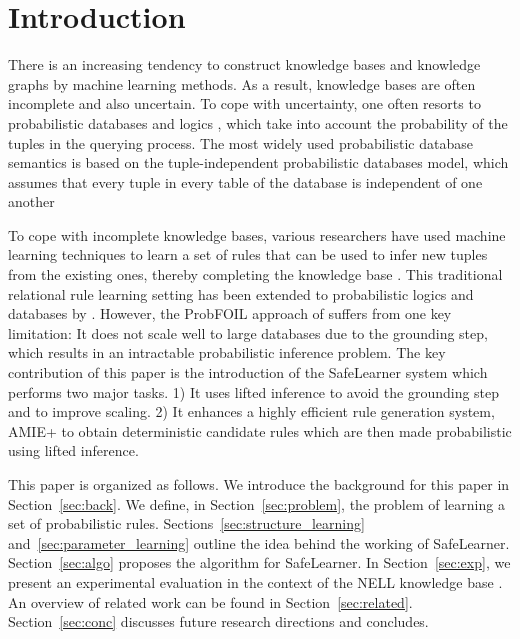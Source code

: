 \documentclass[akbc,twoside,11pt]{article}
\newcommand{\algorithmname}{SafeLearner\xspace}
\begin{document}
\section{Introduction}
\label{Introduction}
There is an increasing tendency to construct knowledge bases and knowledge graphs by machine learning methods. As a result, knowledge bases are often incomplete and also uncertain. To cope with uncertainty, one often resorts to probabilistic databases and logics \cite{DBLP:journals/ftdb/BroeckS17,2016Raedt}, which take into account the probability of the tuples in the querying process. The most widely used probabilistic database semantics is based on the tuple-independent probabilistic databases model, which assumes that every tuple in every table of the database is independent of one another

To cope with incomplete knowledge bases, various researchers have used machine learning techniques to learn a set of rules that can be used to infer new tuples from the existing ones, thereby completing the knowledge base \cite{NELL}. This traditional relational rule learning setting \cite{FOIL} has been extended to probabilistic logics and databases by \citet{DBLP:conf/ijcai/RaedtDTBV15}. However, the ProbFOIL approach of \citeauthor{DBLP:conf/ijcai/RaedtDTBV15} suffers from one key limitation: It does not scale well to large databases due to the grounding step, which results in an intractable probabilistic inference problem. The key contribution of this paper is the introduction of the \algorithmname system which performs two major tasks. 1) It uses lifted inference to avoid the grounding step and to improve scaling. 2) It enhances a highly efficient rule generation system, AMIE+ \cite{DBLP:journals/vldb/GalarragaTHS15} to obtain deterministic candidate rules which are then made probabilistic using lifted inference.

This paper is organized as follows. 
We introduce the background for this paper in Section~\ref{sec:back}.
We define, in Section~\ref{sec:problem}, the problem of learning a set of probabilistic rules.
Sections~\ref{sec:structure_learning} and~\ref{sec:parameter_learning} outline the idea behind the working of \algorithmname.
Section~\ref{sec:algo} proposes the algorithm for \algorithmname.
In Section~\ref{sec:exp}, we present an experimental evaluation in the context of the NELL knowledge base \cite{NELL}.
An overview of related work can be found in Section~\ref{sec:related}.
Section~\ref{sec:conc} discusses future research directions and concludes.
\end{document}
